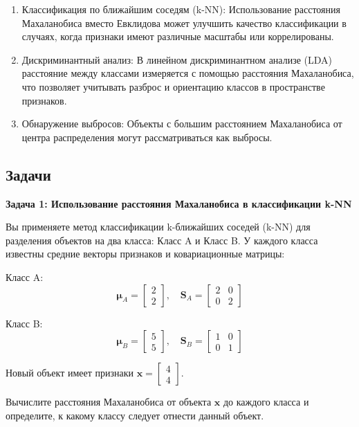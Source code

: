 \begin{enumerate}
    \item Классификация по ближайшим соседям (k-NN): Использование расстояния Махаланобиса вместо Евклидова может улучшить качество классификации в случаях, когда признаки имеют различные масштабы или коррелированы.

    \item Дискриминантный анализ: В линейном дискриминантном анализе (LDA) расстояние между классами измеряется с помощью расстояния Махаланобиса, что позволяет учитывать разброс и ориентацию классов в пространстве признаков.

    \item Обнаружение выбросов: Объекты с большим расстоянием Махаланобиса от центра распределения могут рассматриваться как выбросы.
\end{enumerate}

\subsection{Задачи}

\textbf{Задача 1: Использование расстояния Махаланобиса в классификации k-NN}

Вы применяете метод классификации k-ближайших соседей (k-NN) для разделения объектов на два класса: Класс A и Класс B. У каждого класса известны средние векторы признаков и ковариационные матрицы:

Класс A:
\[
\mathbf{\mu}_A = \begin{bmatrix} 2 \\ 2 \end{bmatrix}, \quad \mathbf{S}_A = \begin{bmatrix} 2 & 0 \\ 0 & 2 \end{bmatrix}
\]

Класс B:
\[
\mathbf{\mu}_B = \begin{bmatrix} 5 \\ 5 \end{bmatrix}, \quad \mathbf{S}_B = \begin{bmatrix} 1 & 0 \\ 0 & 1 \end{bmatrix}
\]

Новый объект имеет признаки \( \mathbf{x} = \begin{bmatrix} 4 \\ 4 \end{bmatrix} \).

Вычислите расстояния Махаланобиса от объекта \( \mathbf{x} \) до каждого класса и определите, к какому классу следует отнести данный объект.

